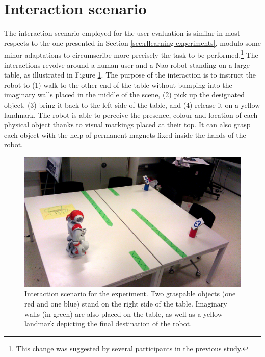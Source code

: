 \section{Interaction scenario}
The interaction scenario employed for the user evaluation is similar in most respects to the one presented in Section \ref{sec:rllearning-experiments}, modulo some minor adaptations to circumscribe more precisely the task to be performed.\footnote{This change was suggested by several participants in the previous study.} The interactions revolve around a human user and a Nao robot standing on a large table, as illustrated in Figure \ref{fig:scenario}.  The purpose of the interaction is to instruct the robot to (1) walk to the other end of the table without bumping into the imaginary walls placed in the middle of the scene, (2) pick up the designated object, (3) bring it back to the left side of the table, and (4) release it on a yellow landmark.  The robot is able to perceive the presence, colour and location of each physical object thanks to visual markings placed at their top.  It can also grasp each object with the help of permanent magnets fixed inside the hands of the robot. 

\begin{figure}[ht]
\vspace{3mm}
\centering
\includegraphics[scale=0.13]{imgs/scenario.jpg} \vspace{3mm}
\caption{Interaction scenario for the experiment.  Two graspable objects (one red and one blue) stand on the right side of the table.  Imaginary walls (in green) are also placed on the table, as well as a yellow landmark depicting the final destination of the robot. }
\label{fig:scenario}
\end{figure}


